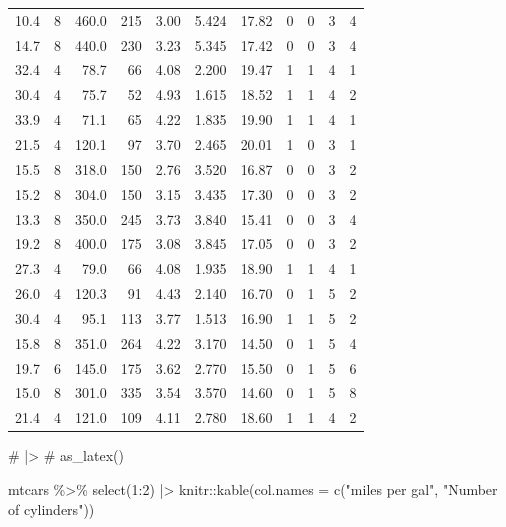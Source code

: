\documentclass[
  letterpaper,
  DIV=11,
  numbers=noendperiod]{scrartcl}
\newenvironment{Shaded}{\begin{snugshade}}{\end{snugshade}}
\newcommand{\AttributeTok}[1]{\textcolor[rgb]{0.40,0.45,0.13}{#1}}
\newcommand{\CommentTok}[1]{\textcolor[rgb]{0.37,0.37,0.37}{#1}}
\newcommand{\DecValTok}[1]{\textcolor[rgb]{0.68,0.00,0.00}{#1}}
\newcommand{\FunctionTok}[1]{\textcolor[rgb]{0.28,0.35,0.67}{#1}}
\newcommand{\NormalTok}[1]{\textcolor[rgb]{0.00,0.23,0.31}{#1}}
\newcommand{\SpecialCharTok}[1]{\textcolor[rgb]{0.37,0.37,0.37}{#1}}
\newcommand{\StringTok}[1]{\textcolor[rgb]{0.13,0.47,0.30}{#1}}
\begin{document}
\begin{longtable*}{rrrrrrrrrrr}
10.4 & 8 & 460.0 & 215 & 3.00 & 5.424 & 17.82 & 0 & 0 & 3 & 4 \\ 
14.7 & 8 & 440.0 & 230 & 3.23 & 5.345 & 17.42 & 0 & 0 & 3 & 4 \\ 
32.4 & 4 & 78.7 & 66 & 4.08 & 2.200 & 19.47 & 1 & 1 & 4 & 1 \\ 
30.4 & 4 & 75.7 & 52 & 4.93 & 1.615 & 18.52 & 1 & 1 & 4 & 2 \\ 
33.9 & 4 & 71.1 & 65 & 4.22 & 1.835 & 19.90 & 1 & 1 & 4 & 1 \\ 
21.5 & 4 & 120.1 & 97 & 3.70 & 2.465 & 20.01 & 1 & 0 & 3 & 1 \\ 
15.5 & 8 & 318.0 & 150 & 2.76 & 3.520 & 16.87 & 0 & 0 & 3 & 2 \\ 
15.2 & 8 & 304.0 & 150 & 3.15 & 3.435 & 17.30 & 0 & 0 & 3 & 2 \\ 
13.3 & 8 & 350.0 & 245 & 3.73 & 3.840 & 15.41 & 0 & 0 & 3 & 4 \\ 
19.2 & 8 & 400.0 & 175 & 3.08 & 3.845 & 17.05 & 0 & 0 & 3 & 2 \\ 
27.3 & 4 & 79.0 & 66 & 4.08 & 1.935 & 18.90 & 1 & 1 & 4 & 1 \\ 
26.0 & 4 & 120.3 & 91 & 4.43 & 2.140 & 16.70 & 0 & 1 & 5 & 2 \\ 
30.4 & 4 & 95.1 & 113 & 3.77 & 1.513 & 16.90 & 1 & 1 & 5 & 2 \\ 
15.8 & 8 & 351.0 & 264 & 4.22 & 3.170 & 14.50 & 0 & 1 & 5 & 4 \\ 
19.7 & 6 & 145.0 & 175 & 3.62 & 2.770 & 15.50 & 0 & 1 & 5 & 6 \\ 
15.0 & 8 & 301.0 & 335 & 3.54 & 3.570 & 14.60 & 0 & 1 & 5 & 8 \\ 
21.4 & 4 & 121.0 & 109 & 4.11 & 2.780 & 18.60 & 1 & 1 & 4 & 2 \\ 
\bottomrule
\end{longtable*}

\begin{Shaded}
\begin{Highlighting}[]
\CommentTok{\# |\textgreater{} }
\CommentTok{\#   as\_latex()}
\end{Highlighting}
\end{Shaded}

\begin{Shaded}
\begin{Highlighting}[]
\NormalTok{mtcars }\SpecialCharTok{\%\textgreater{}\%} 
  \FunctionTok{select}\NormalTok{(}\DecValTok{1}\SpecialCharTok{:}\DecValTok{2}\NormalTok{) }\SpecialCharTok{|\textgreater{}} 
\NormalTok{  knitr}\SpecialCharTok{::}\FunctionTok{kable}\NormalTok{(}\AttributeTok{col.names =} \FunctionTok{c}\NormalTok{(}\StringTok{"miles per gal"}\NormalTok{, }\StringTok{"Number of cylinders"}\NormalTok{))}
\end{Highlighting}
\end{Shaded}
\end{document}
